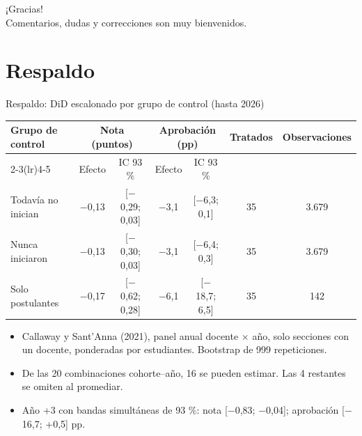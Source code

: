 \documentclass[10pt,aspectratio=169]{beamer}
\begin{document}
\begin{frame}
  \begin{center}
    {\Large ¡Gracias!}\\[1em]
    Comentarios, dudas y correcciones son muy bienvenidos.
  \end{center}
\end{frame}

\appendix
\section*{Respaldo}

\begin{frame}{Respaldo: DiD escalonado por grupo de control (hasta 2026)}
  \begin{table}\scriptsize
    \begin{tabular}{lcccccc}
      \toprule
      Grupo de control & \multicolumn{2}{c}{Nota (puntos)} & \multicolumn{2}{c}{Aprobación (pp)} & Tratados & Observaciones \\
      \cmidrule(lr){2-3}\cmidrule(lr){4-5}
      & Efecto & IC 93 \% & Efecto & IC 93 \% & & \\
      \midrule
      Todavía no inician & $-$0,13 & [$-$0,29; 0,03] & $-$3,1 & [$-$6,3; 0,1] & 35 & 3.679 \\
      Nunca iniciaron & $-$0,13 & [$-$0,30; 0,03] & $-$3,1 & [$-$6,4; 0,3] & 35 & 3.679 \\
      Solo postulantes & $-$0,17 & [$-$0,62; 0,28] & $-$6,1 & [$-$18,7; 6,5] & 35 & 142 \\
      \bottomrule
    \end{tabular}
  \end{table}
  \vspace{0.3em}
  \begin{itemize}\small
    \item Callaway y Sant'Anna (2021), panel anual docente $\times$ año, solo secciones con un docente, ponderadas por estudiantes. Bootstrap de 999 repeticiones.
    \item De las 20 combinaciones cohorte--año, 16 se pueden estimar. Las 4 restantes se omiten al promediar.
    \item Año +3 con bandas simultáneas de 93 \%: nota [$-$0,83; $-$0,04]; aprobación [$-$16,7; +0,5] pp.
  \end{itemize}
\end{frame}
\end{document}
